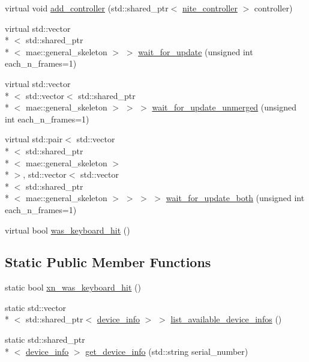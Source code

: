 \begin{DoxyCompactItemize}
\item 
virtual void \hyperlink{classmae_1_1nite_1_1nite__farm_a0e0555f8067b6ab56374bb885a58227f}{add\-\_\-controller} (std\-::shared\-\_\-ptr$<$ \hyperlink{classmae_1_1nite_1_1nite__controller}{nite\-\_\-controller} $>$ controller)
\item 
virtual std\-::vector\\*
$<$ std\-::shared\-\_\-ptr\\*
$<$ mae\-::general\-\_\-skeleton $>$ $>$ \hyperlink{classmae_1_1nite_1_1nite__farm_a9f6ac5a26cf5434a62487cbae5eb520f}{wait\-\_\-for\-\_\-update} (unsigned int each\-\_\-n\-\_\-frames=1)
\item 
virtual std\-::vector\\*
$<$ std\-::vector$<$ std\-::shared\-\_\-ptr\\*
$<$ mae\-::general\-\_\-skeleton $>$ $>$ $>$ \hyperlink{classmae_1_1nite_1_1nite__farm_aad64f4dc6574423b1b0faa9041d57f44}{wait\-\_\-for\-\_\-update\-\_\-unmerged} (unsigned int each\-\_\-n\-\_\-frames=1)
\item 
virtual std\-::pair$<$ std\-::vector\\*
$<$ std\-::shared\-\_\-ptr\\*
$<$ mae\-::general\-\_\-skeleton $>$\\*
 $>$, std\-::vector$<$ std\-::vector\\*
$<$ std\-::shared\-\_\-ptr\\*
$<$ mae\-::general\-\_\-skeleton $>$ $>$ $>$ $>$ \hyperlink{classmae_1_1nite_1_1nite__farm_a4c01b35313afcff3bd096247543add9b}{wait\-\_\-for\-\_\-update\-\_\-both} (unsigned int each\-\_\-n\-\_\-frames=1)
\item 
virtual bool \hyperlink{classmae_1_1nite_1_1nite__farm_a32e021b17e5fe042a56f85ab31eaceae}{was\-\_\-keyboard\-\_\-hit} ()
\end{DoxyCompactItemize}
\subsection*{Static Public Member Functions}
\begin{DoxyCompactItemize}
\item 
static bool \hyperlink{classmae_1_1nite_1_1nite__farm_abe33f6995a45676e1f0cfc98ecf143c7}{xn\-\_\-was\-\_\-keyboard\-\_\-hit} ()
\item 
static std\-::vector\\*
$<$ std\-::shared\-\_\-ptr$<$ \hyperlink{classmae_1_1nite_1_1device__info}{device\-\_\-info} $>$ $>$ \hyperlink{classmae_1_1nite_1_1nite__farm_a28c0270899b4f03825a6572e17c42d43}{list\-\_\-available\-\_\-device\-\_\-infos} ()
\item 
static std\-::shared\-\_\-ptr\\*
$<$ \hyperlink{classmae_1_1nite_1_1device__info}{device\-\_\-info} $>$ \hyperlink{classmae_1_1nite_1_1nite__farm_ad3577dd836ce06576c8e7cb01bf863cc}{get\-\_\-device\-\_\-info} (std\-::string serial\-\_\-number)
\end{DoxyCompactItemize}


